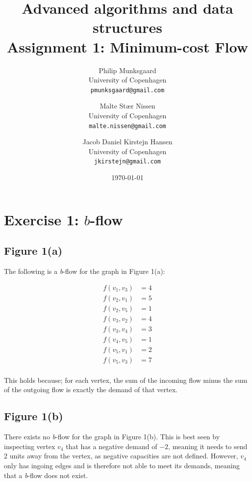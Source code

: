 \documentclass[11pt,a4paper,english]{article}
\title{Advanced algorithms and data structures\\
       Assignment 1: Minimum-cost Flow}
\author{
  Philip Munksgaard\\
    University of Copenhagen\\
    \texttt{pmunksgaard@gmail.com}
    \and
	Malte Stær Nissen\\
    University of Copenhagen\\
	  \texttt{malte.nissen@gmail.com}
    \and
  Jacob Daniel Kirstejn Hansen\\
    University of Copenhagen\\
    \texttt{jkirstejn@gmail.com}
}
\date{\today}
\begin{document}
\maketitle

\tableofcontents
\clearpage

\section{Exercise 1: $b$-flow}
 
\subsection{Figure 1(a)}
 
The following is a \emph{b}-flow for the graph in Figure 1(a):
 
\begin{align*}
  f(v_1, v_3) &= 4 \\
  f(v_2, v_1) &= 5 \\
  f(v_2, v_5) &= 1 \\
  f(v_3, v_2) &= 4 \\
  f(v_3, v_4) &= 3 \\
  f(v_4, v_5) &= 1 \\
  f(v_5, v_1) &= 2 \\
  f(v_5, v_3) &= 7 \\
\end{align*}
 
This holds because; for each vertex, the sum of the incoming flow minus the   
sum of the outgoing flow is exactly the demand of that vertex.                

\subsection{Figure 1(b)}
 
There exists no \emph{b}-flow for the graph in Figure 1(b). This is best seen 
by inspecting vertex $v_4$ that has a negative demand of $-2$, meaning it     
needs to send 2 units away from the vertex, as negative capacities are not    
defined. However, $v_4$ only has ingoing edges and is therefore not able to   
meet its demands, meaning that a \emph{b}-flow does not exist.                

\end{document}
